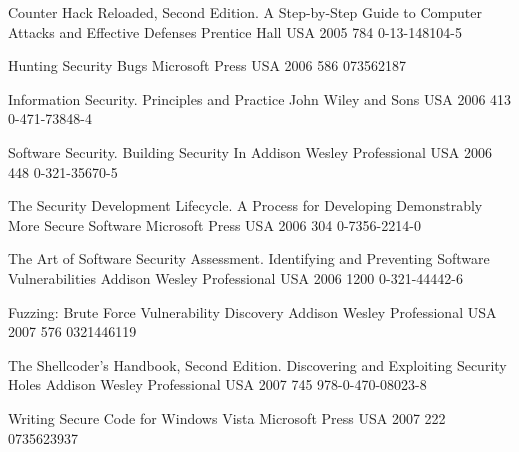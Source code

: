 \begin{thebibliography}{9}
		{
			\biband
			}
		{Counter Hack Reloaded, Second Edition. A Step-by-Step Guide to Computer Attacks and Effective Defenses}
		{}
		{Prentice Hall}
		{USA}
		{2005}
		{784}
		{0-13-148104-5}
	
		{
			\biband
			\biband
			}
		{Hunting Security Bugs}
		{}
		{Microsoft Press}
		{USA}
		{2006}
		{586}
		{073562187}
	
		{}
		{Information Security. Principles and Practice}
		{}
		{John Wiley and Sons}
		{USA}
		{2006}
		{413}
		{0-471-73848-4}
	
		{}
		{Software Security. Building Security In}
		{}
		{Addison Wesley Professional}
		{USA}
		{2006}
		{448}
		{0-321-35670-5}
	
		{
			\biband
			}
		{The Security Development Lifecycle. A Process for Developing Demonstrably More Secure Software}
		{}
		{Microsoft Press}
		{USA}
		{2006}
		{304}
		{0-7356-2214-0}
	
		{
			\biband
			\biband
			}
		{The Art of Software Security Assessment. Identifying and Preventing Software Vulnerabilities}
		{}
		{Addison Wesley Professional}
		{USA}
		{2006}
		{1200}
		{0-321-44442-6}
	
		{
			\biband
			\biband
			}
		{Fuzzing: Brute Force Vulnerability Discovery}
		{}
		{Addison Wesley Professional}
		{USA}
		{2007}
		{576}
		{0321446119}
	
		{
			\biband
			\biband
			\biband
			}
		{The Shellcoder's Handbook, Second Edition. Discovering and Exploiting Security Holes}
		{}
		{Addison Wesley Professional}
		{USA}
		{2007}
		{745}
		{978-0-470-08023-8}
	
		{
			\biband
			}
		{Writing Secure Code for {W}indows {V}ista}
		{}
		{Microsoft Press}
		{USA}
		{2007}
		{222}
		{0735623937}
	

\end{thebibliography}
